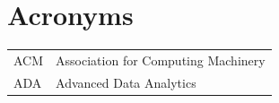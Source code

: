 \section*{Acronyms}
\begin{table}[hb]
    \begin{tabular}{p{4cm} p{10cm}}
     ACM & Association for Computing Machinery \\
     ADA & Advanced Data Analytics \\
    \end{tabular}%
\end{table}%
